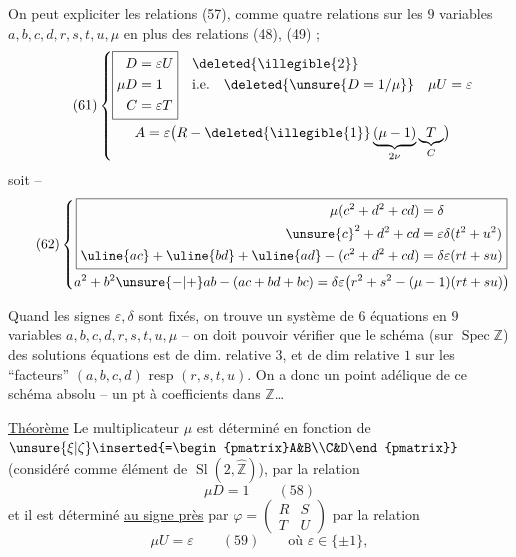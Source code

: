 On peut expliciter les relations (57), comme  quatre relations sur les $9$ variables $a,b,c,d,r,s,t,u,\mu$ en plus des relations (48), (49) ;
\[
\tag{61}
\left\{\begin{gathered}
\boxed{\begin{aligned}
D&=\varepsilon U\\
\mu D&=1\\
C&=\varepsilon T
\end{aligned}}
\quad\begin{aligned}
&\deleted{\illegible{2}}\\
&\text{i.e.}\quad\deleted{\unsure{D=1/\mu}}\quad\mu U=\varepsilon\\
&
\end{aligned}\\
A=\varepsilon\bigl(R-\deleted{\illegible{1}}\underbrace{(\mu-1)}_{2\nu}\underbrace{T}_{C}\bigr)
\end{gathered}\right.
\]
soit --  
\[
\tag{62}
\left\{\begin{gathered}
\boxed{\begin{aligned}
\mu(c^2+d^2+cd)&=\delta\\
\unsure{c}^2+d^2+cd&=\varepsilon\delta(t^2+u^2)\\
\uline{ac}+\uline{bd}+\uline{ad}-(c^2+d^2+cd)&=\delta\varepsilon(rt+su)
\end{aligned}}\\
a^2+b^2\unsure{-|+}ab-(ac+bd+bc)=\delta\varepsilon\bigl(r^2+s^2-(\mu-1)(rt+su)\bigr)
\end{gathered}\right.
\]

Quand les signes $\varepsilon,\delta$ sont fixés, on trouve  un système de $6$ équations en $9$ variables $a,b,c,d,r,s,t,u,\mu$ -- on doit pouvoir vérifier que le schéma (sur $\operatorname{Spec}\mathbb Z$) des solutions  équations est de dim. relative $3$, et de dim relative $1$ sur les ``facteurs'' $(a,b,c,d)$ resp $(r,s,t,u)$. On a donc un point adélique de ce schéma absolu -- un pt à coefficients dans $\widehat{\mathbb Z}$\ldots
{}

\uline{Théorème} Le multiplicateur $\mu$ est déterminé en fonction de $\unsure{\xi|\zeta}\inserted{=\begin{pmatrix}A&B\\C&D\end{pmatrix}}$ (considéré comme élément de $\operatorname{Sl}(2,\widehat{\mathbb Z})$), par la relation
\[
\mu D=1\qquad(58)
\]
\unsure{\textup{(+)}}
et il est déterminé \uline{au signe près} par $\varphi=\begin{pmatrix}R&S\\T&U\end{pmatrix}$ par la relation
\[
\mu U=\varepsilon\qquad(59)\qquad\text{où }\varepsilon\in\{\pm1\},
\]

